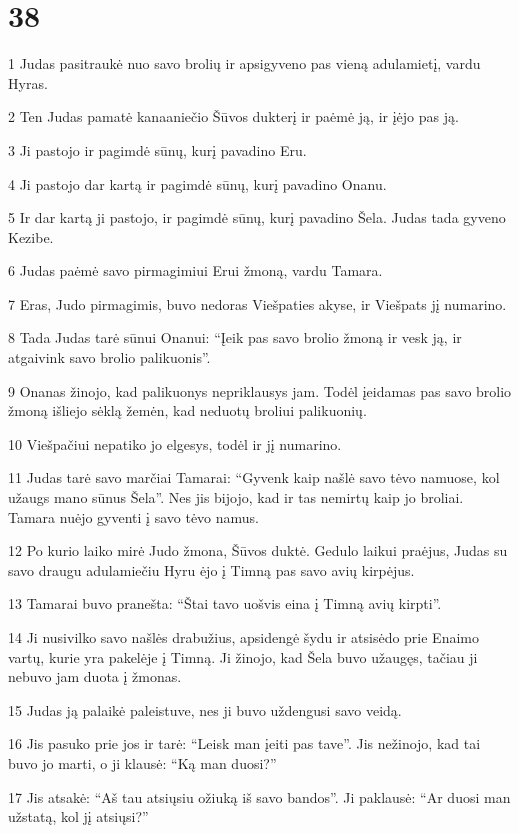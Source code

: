\chapter{38}

\par 1 Judas pasitraukė nuo savo brolių ir apsigyveno pas vieną adulamietį, vardu Hyras. 
\par 2 Ten Judas pamatė kanaaniečio Šūvos dukterį ir paėmė ją, ir įėjo pas ją. 
\par 3 Ji pastojo ir pagimdė sūnų, kurį pavadino Eru. 
\par 4 Ji pastojo dar kartą ir pagimdė sūnų, kurį pavadino Onanu. 
\par 5 Ir dar kartą ji pastojo, ir pagimdė sūnų, kurį pavadino Šela. Judas tada gyveno Kezibe. 
\par 6 Judas paėmė savo pirmagimiui Erui žmoną, vardu Tamara. 
\par 7 Eras, Judo pirmagimis, buvo nedoras Viešpaties akyse, ir Viešpats jį numarino. 
\par 8 Tada Judas tarė sūnui Onanui: “Įeik pas savo brolio žmoną ir vesk ją, ir atgaivink savo brolio palikuonis”. 
\par 9 Onanas žinojo, kad palikuonys nepriklausys jam. Todėl įeidamas pas savo brolio žmoną išliejo sėklą žemėn, kad neduotų broliui palikuonių. 
\par 10 Viešpačiui nepatiko jo elgesys, todėl ir jį numarino. 
\par 11 Judas tarė savo marčiai Tamarai: “Gyvenk kaip našlė savo tėvo namuose, kol užaugs mano sūnus Šela”. Nes jis bijojo, kad ir tas nemirtų kaip jo broliai. Tamara nuėjo gyventi į savo tėvo namus. 
\par 12 Po kurio laiko mirė Judo žmona, Šūvos duktė. Gedulo laikui praėjus, Judas su savo draugu adulamiečiu Hyru ėjo į Timną pas savo avių kirpėjus. 
\par 13 Tamarai buvo pranešta: “Štai tavo uošvis eina į Timną avių kirpti”. 
\par 14 Ji nusivilko savo našlės drabužius, apsidengė šydu ir atsisėdo prie Enaimo vartų, kurie yra pakelėje į Timną. Ji žinojo, kad Šela buvo užaugęs, tačiau ji nebuvo jam duota į žmonas. 
\par 15 Judas ją palaikė paleistuve, nes ji buvo uždengusi savo veidą. 
\par 16 Jis pasuko prie jos ir tarė: “Leisk man įeiti pas tave”. Jis nežinojo, kad tai buvo jo marti, o ji klausė: “Ką man duosi?” 
\par 17 Jis atsakė: “Aš tau atsiųsiu ožiuką iš savo bandos”. Ji paklausė: “Ar duosi man užstatą, kol jį atsiųsi?” 
